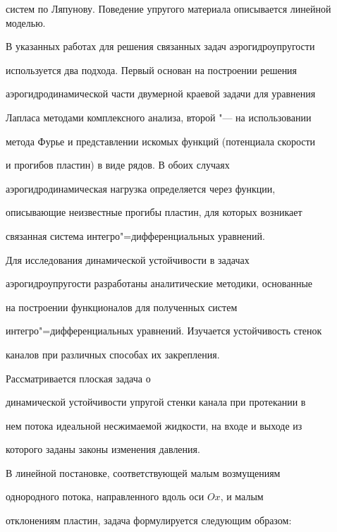 систем по Ляпунову. Поведение упругого материала описывается линейной моделью.



В указанных работах для решения связанных задач аэрогидроупругости

используется два подхода. Первый основан на построении решения

аэрогидродинамической части двумерной краевой задачи для уравнения

Лапласа методами комплексного анализа, второй "--- на использовании

метода Фурье и представлении искомых функций (потенциала скорости

и прогибов пластин) в виде рядов. В обоих случаях

аэрогидродинамическая нагрузка определяется через функции,

описывающие неизвестные прогибы пластин, для которых возникает

связанная система интегро"=дифференциальных уравнений.



Для исследования динамической устойчивости в задачах

аэрогидроупругости разработаны аналитические методики, основанные

на построении функционалов для полученных систем

интегро"=дифференциальных уравнений. \linebreak \mbox{Изучается} устойчивость стенок

каналов при различных способах их закрепления.



\smallskip



 Рассматривается плоская задача о

динамической устойчивости упругой стенки канала при протекании в

нем потока идеальной несжимаемой жидкости, на входе и выходе из

которого заданы законы изменения давления.



В линейной постановке, соответствующей малым возмущениям

однородного потока, направленного вдоль оси $Ox$, и малым

отклонениям пластин, задача формулируется следующим образом:

